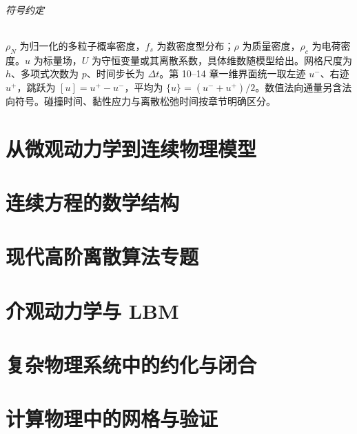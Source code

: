 \documentclass[11pt,openany]{ctexbook}
\begin{document}
\paragraph{符号约定}
$\rho_N$ 为归一化的多粒子概率密度，$f_s$ 为数密度型分布；$\rho$ 为质量密度，$\rho_c$ 为电荷密度。$u$ 为标量场，$U$ 为守恒变量或其离散系数，具体维数随模型给出。网格尺度为 $h$、多项式次数为 $p$、时间步长为 $\Delta t$。第 10--14 章一维界面统一取左迹 $u^-$、右迹 $u^+$，跳跃为 $[u]=u^+-u^-$，平均为 $\{u\}=(u^-+u^+)/2$。数值法向通量另含法向符号。碰撞时间、黏性应力与离散松弛时间按章节明确区分。

\tableofcontents
\mainmatter
\part{从微观动力学到连续物理模型}




\part{连续方程的数学结构}





\part{现代高阶离散算法专题}





\part{介观动力学与 LBM}


\part{复杂物理系统中的约化与闭合}



\part{计算物理中的网格与验证}



\backmatter

\clearpage
{}
{}
\printindex
\end{document}
